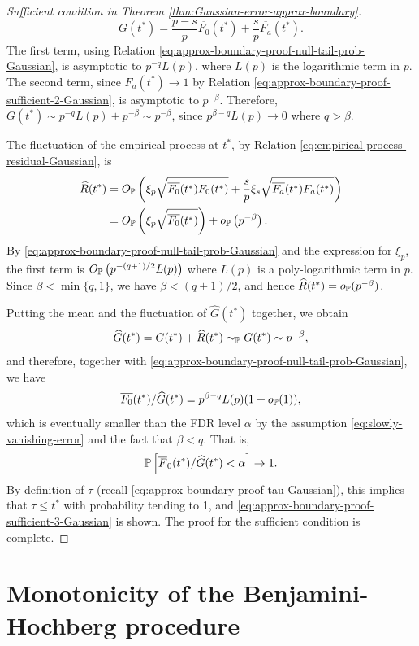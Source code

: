 \begin{proof}[Sufficient condition in Theorem \ref{thm:Gaussian-error-approx-boundary}]
\begin{equation} \label{eq:approx-boundary-proof-sufficient-4-Gaussian}
    G(t^*) = \frac{p-s}{p}\overline{F_0}(t^*) + \frac{s}{p}\overline{F_a}(t^*).
\end{equation}
The first term, using Relation \eqref{eq:approx-boundary-proof-null-tail-prob-Gaussian}, is asymptotic to $p^{-q}L(p)$, where $L(p)$ is the logarithmic term in $p$.
The second term, since $\overline{F_a}(t^*)\to 1$ by Relation \eqref{eq:approx-boundary-proof-sufficient-2-Gaussian}, is asymptotic to $p^{-\beta}$.
Therefore, $G(t^*) \sim p^{-q}L(p) + p^{-\beta} \sim p^{-\beta}$, since 
$p^{\beta-q}L(p)\to0$ where $q>\beta$.

The fluctuation of the empirical process at $t^*$, by Relation \eqref{eq:empirical-process-residual-Gaussian}, is 
\begin{align*}
    \widehat{R}(t^*) 
    &= O_\P\left(\xi_p\sqrt{\overline{F_0}(t^*)F_0(t^*)} + \frac{s}{p}\xi_s\sqrt{\overline{F_a}(t^*)F_a(t^*)}\right)\\
    &= O_\P\left(\xi_p\sqrt{\overline{F_0}(t^*)}\right) + o_\P\left(p^{-\beta}\right).
\end{align*}
By \eqref{eq:approx-boundary-proof-null-tail-prob-Gaussian} and the expression for $\xi_p$, the first term is $O_\P\left(p^{-(q+1)/2}L(p)\right)$ where $L(p)$ is a poly-logarithmic term in $p$.
Since $\beta<\min\{q,1\}$, we have $\beta<(q+1)/2$, and hence $\widehat{R}(t^*) = o_\P(p^{-\beta})$.

Putting the mean and the fluctuation of $\widehat{G}(t^*)$ together, we obtain
$$
\widehat{G}(t^*) = G(t^*) + \widehat{R}(t^*) \sim_\P G(t^*) \sim p^{-\beta},
$$
and therefore, together with \eqref{eq:approx-boundary-proof-null-tail-prob-Gaussian}, we have
$$
\overline{F_0}(t^*)/\widehat{G}(t^*) = p^{\beta-q}L(p)(1+o_{\P}(1)),
$$
which is eventually smaller than the FDR level $\alpha$ by the assumption \eqref{eq:slowly-vanishing-error} and the fact that $\beta<q$.
That is, 
$$
\P\left[\overline{F}_0(t^*) / \widehat{G}(t^*) < \alpha\right] \to 1.
$$
By definition of $\tau$ (recall \eqref{eq:approx-boundary-proof-tau-Gaussian}), this implies that $\tau \le t^*$ with probability tending to 1, and \eqref{eq:approx-boundary-proof-sufficient-3-Gaussian} is shown.
The proof for the sufficient condition is complete.
\end{proof}


\section{Monotonicity of the Benjamini-Hochberg procedure}
\label{sec:BH-monotonicity}



